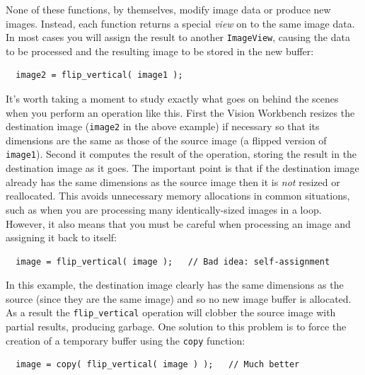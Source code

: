 None of these functions, by themselves, modify image data or produce
new images.  Instead, each function returns a special {\it view}
on to the same image data.  In most cases you will assign the result
to another \verb#ImageView#, causing the data to be processed and
the resulting image to be stored in the new buffer:
\begin{verbatim}
  image2 = flip_vertical( image1 );
\end{verbatim}
It's worth taking a moment to study exactly what goes on behind
the scenes when you perform an operation like this.  First the
Vision Workbench resizes the destination image (\verb#image2#
in the above example) if necessary so that its dimensions are
the same as those of the source image (a flipped version of
\verb#image1#).  Second it computes the result of the operation,
storing the result in the destination image as it goes.  The
important point is that if the destination image already has the
same dimensions as the source image then it is {\it not} resized
or reallocated.  This avoids unnecessary memory allocations in
common situations, such as when you are processing many
identically-sized images in a loop.  However, it also means that
you must be careful when processing an image and assigning it back
to itself:
\begin{verbatim}
  image = flip_vertical( image );   // Bad idea: self-assignment
\end{verbatim}
In this example, the destination image clearly has the same
dimensions as the source (since they are the same image) and so
no new image buffer is allocated.  As a result the
\verb#flip_vertical# operation will clobber the source image with
partial results, producing garbage.  One solution to this problem
is to force the creation of a temporary buffer using the \verb#copy#
function:
\begin{verbatim}
  image = copy( flip_vertical( image ) );   // Much better
\end{verbatim}

